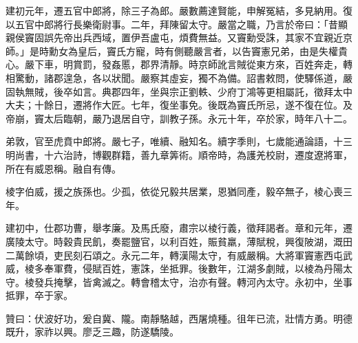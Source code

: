 \begin{pinyinscope}
建初元年，遷五官中郎將，除三子為郎。嚴數薦達賢能，申解冤結，多見納用。復以五官中郎將行長樂衛尉事。二年，拜陳留太守。嚴當之職，乃言於帝曰：「昔顯親侯竇固誤先帝出兵西域，置伊吾盧屯，煩費無益。又竇勳受誅，其家不宜親近京師。」是時勳女為皇后，竇氏方寵，時有側聽嚴言者，以告竇憲兄弟，由是失權貴心。嚴下車，明賞罰，發姦慝，郡界清靜。時京師訛言賊從東方來，百姓奔走，轉相驚動，諸郡遑急，各以狀聞。嚴察其虛妄，獨不為備。詔書敕問，使驛係道，嚴固執無賊，後卒如言。典郡四年，坐與宗正劉軼、少府丁鴻等更相屬託，徵拜太中大夫；十餘日，遷將作大匠。七年，復坐事免。後既為竇氏所忌，遂不復在位。及帝崩，竇太后臨朝，嚴乃退居自守，訓教子孫。永元十年，卒於家，時年八十二。

弟敦，官至虎賁中郎將。嚴七子，唯續、融知名。續字季則，七歲能通論語，十三明尚書，十六治詩，博觀群籍，善九章筭術。順帝時，為護羌校尉，遷度遼將軍，所在有威恩稱。融自有傳。

棱字伯威，援之族孫也。少孤，依從兄毅共居業，恩猶同產，毅卒無子，棱心喪三年。

建初中，仕郡功曹，舉孝廉。及馬氏廢，肅宗以棱行義，徵拜謁者。章和元年，遷廣陵太守。時穀貴民飢，奏罷鹽官，以利百姓，賑貧羸，薄賦稅，興復陂湖，溉田二萬餘頃，吏民刻石頌之。永元二年，轉漢陽太守，有威嚴稱。大將軍竇憲西屯武威，棱多奉軍費，侵賦百姓，憲誅，坐抵罪。後數年，江湖多劇賊，以棱為丹陽太守。棱發兵掩擊，皆禽滅之。轉會稽太守，治亦有聲。轉河內太守。永初中，坐事抵罪，卒于家。

贊曰：伏波好功，爰自冀、隴。南靜駱越，西屠燒種。徂年已流，壯情方勇。明德既升，家祚以興。廖乏三趣，防遂驕陵。


\end{pinyinscope}